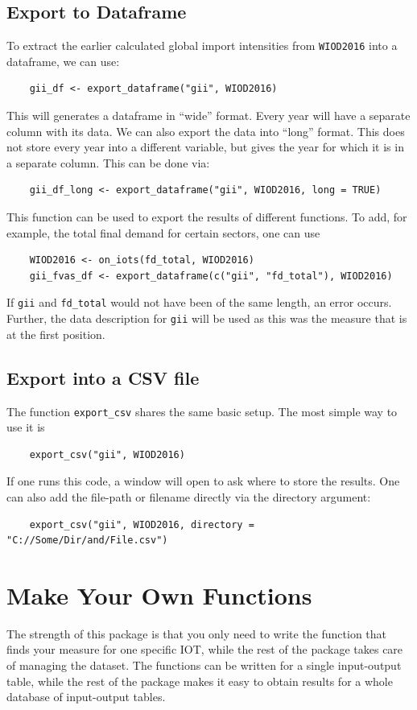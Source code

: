 \documentclass[10pt,a4paper]{paper}
\begin{document}
	\subsection{Export to Dataframe}
	
	To extract the earlier calculated global import intensities from \texttt{WIOD2016} into a dataframe, we can use:
	\begin{Verbatim}
	gii_df <- export_dataframe("gii", WIOD2016)
	\end{Verbatim}
	This will generates a dataframe in ``wide'' format. Every year will have a separate column with its data. We can also export the data into ``long'' format. This does not store every year into a different variable, but gives the year for which it is in a separate column. This can be done via:
	\begin{Verbatim}
	gii_df_long <- export_dataframe("gii", WIOD2016, long = TRUE)
	\end{Verbatim}
	This function can be used to export the results of different functions. To add, for example, the total final demand for certain sectors, one can use
	\begin{Verbatim}
	WIOD2016 <- on_iots(fd_total, WIOD2016)
	gii_fvas_df <- export_dataframe(c("gii", "fd_total"), WIOD2016)
	\end{Verbatim}
		
	If \texttt{gii} and \texttt{fd\_total} would not have been of the same length, an error occurs. Further, the data description for \texttt{gii} will be used as this was the measure that is at the first position.
	
	\subsection{Export into a CSV file}
	The function \texttt{export\_csv} shares the same basic setup. The most simple way to use it is
	\begin{Verbatim}
	export_csv("gii", WIOD2016)
	\end{Verbatim}
	If one runs this code, a window will open to ask where to store the results. One can also add the file-path or filename directly via the directory argument:
	\begin{Verbatim}
	export_csv("gii", WIOD2016, directory = "C://Some/Dir/and/File.csv")
	\end{Verbatim}
	\section{Make Your Own Functions}
	\label{sec:ownfunction}
	The strength of this package is that you only need to write the function that finds your measure for one specific IOT, while the rest of the package takes care of managing the dataset. The functions can be written for a single input-output table, while the rest of the package makes it easy to obtain results for a whole database of input-output tables.
	
\end{document}
